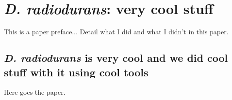 \chapter{\textit{D. radiodurans}: very cool stuff}

This is a paper preface... Detail what I did and what I didn't in this paper.

\section*{\textit{D. radiodurans} is very cool and we did cool stuff with it using cool tools}


Here goes the paper.

% 
